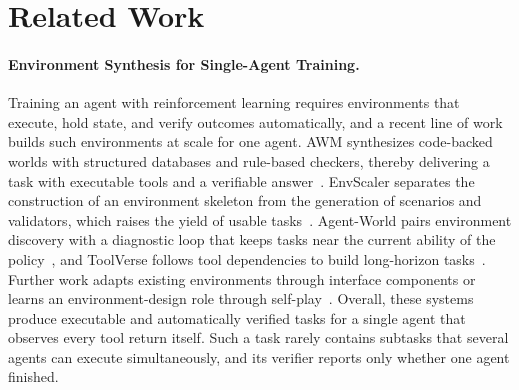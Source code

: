 \section{Related Work}
\label{sec:rw}

\paragraph{Environment Synthesis for Single-Agent Training.}
Training an agent with reinforcement learning requires environments that execute, hold state, and verify outcomes automatically, and a recent line of work builds such environments at scale for one agent.
AWM synthesizes code-backed worlds with structured databases and rule-based checkers, thereby delivering a task with executable tools and a verifiable answer~\citep{wang2026agentworldmodelinfinity}.
EnvScaler separates the construction of an environment skeleton from the generation of scenarios and validators, which raises the yield of usable tasks~\citep{song2026envscaler}.
Agent-World pairs environment discovery with a diagnostic loop that keeps tasks near the current ability of the policy~\citep{dong2026agentworld}, and ToolVerse follows tool dependencies to build long-horizon tasks~\citep{zhou2026toolverse}.
Further work adapts existing environments through interface components or learns an environment-design role through self-play~\citep{huang2026envharness,liu2026spade}.
Overall, these systems produce executable and automatically verified tasks for a single agent that observes every tool return itself.
Such a task rarely contains subtasks that several agents can execute simultaneously, and its verifier reports only whether one agent finished.

